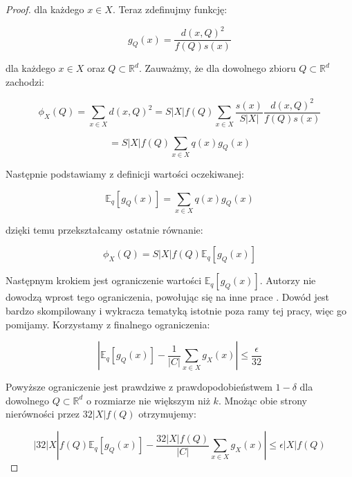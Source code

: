 \begin{proof}
\noindent
dla każdego $x \in X$. Teraz zdefinujmy funkcję:

\begin{equation}
    g_{Q}(x) = \frac{d(x, Q)^2}{f(Q)s(x)}
\end{equation}

\noindent
dla każdego $x \in X$ oraz $Q \subset \mathbb{R}^{d}$.
Zauważmy, że dla dowolnego zbioru  $Q \subset \mathbb{R}^{d}$ zachodzi:

\begin{equation}
    \phi_{X}(Q) = \sum_{x \in X} d(x, Q)^2 = S|X|f(Q) \sum_{x \in X} \frac{s(x)}{S|X|} \frac{d(x, Q)^2}{f(Q)s(x)}
\end{equation}

\begin{equation}
    =  S|X|f(Q) \sum_{x \in X} q(x) g_{Q}(x)
\end{equation}

\noindent
Następnie podstawiamy z definicji wartości oczekiwanej:

\begin{equation}
    \mathbb{E}_q[g_{Q}(x)] = \sum _{x \in X} q(x) g_{Q}(x)
\end{equation}

\noindent
dzięki temu przekształcamy ostatnie równanie:

\begin{equation}
    \phi_{X}(Q) = S|X|f(Q)\mathbb{E}_q[g_{Q}(x)]
\end{equation}

\noindent
Następnym krokiem jest ograniczenie wartości $\mathbb{E}_q[g_{Q}(x)]$.
Autorzy \cite{bachem2017scalable} nie dowodzą wprost tego ograniczenia, powołując się na inne prace \cite{LI2001516}.
Dowód jest bardzo skompilowany i wykracza tematyką istotnie poza ramy tej pracy, więc go pomijamy.
Korzystamy z finalnego ograniczenia:

\begin{equation}
    |\mathbb{E}_q[g_{Q}(x)] - \frac{1}{|C|} \sum_{x \in X}g_{X}(x)| \leq \frac{\epsilon}{32}
\end{equation}

\noindent
Powyższe ograniczenie jest prawdziwe z prawdopodobieństwem $1 - \delta$ dla dowolnego $Q \subset \mathbb{R}^{d}$ o rozmiarze nie większym niż $k$.
Mnożąc obie strony nierówności przez $32|X|f(Q)$ otrzymujemy:

\begin{equation}
    |32|X|f(Q)\mathbb{E}_q[g_{Q}(x)] - \frac{32|X|f(Q)}{|C|} \sum_{x \in X}g_{X}(x)| \leq \epsilon|X|f(Q)
\end{equation}


\end{proof}
